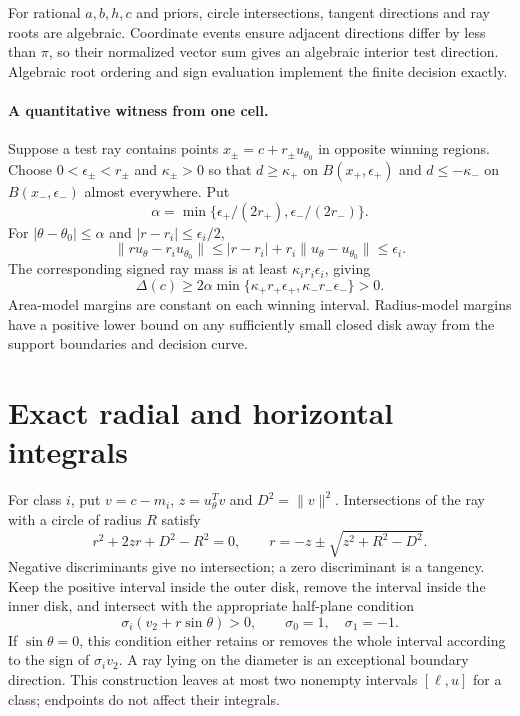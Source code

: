 For rational $a,b,h,c$ and priors, circle intersections, tangent directions and ray roots are algebraic. Coordinate events ensure adjacent directions differ by less than $\pi$, so their normalized vector sum gives an algebraic interior test direction. Algebraic root ordering and sign evaluation implement the finite decision exactly.

\paragraph{A quantitative witness from one cell.}
Suppose a test ray contains points $x_\pm=c+r_\pm u_{\theta_0}$ in opposite winning regions. Choose $0<\epsilon_\pm<r_\pm$ and $\kappa_\pm>0$ so that $d\geq\kappa_+$ on $B(x_+,\epsilon_+)$ and $d\leq-\kappa_-$ on $B(x_-,\epsilon_-)$ almost everywhere. Put
\[
 \alpha=\min\{\epsilon_+/(2r_+),\epsilon_-/(2r_-)\}.
\]
For $|\theta-\theta_0|\leq\alpha$ and $|r-r_i|\leq\epsilon_i/2$,
\[
 \|ru_\theta-r_i u_{\theta_0}\|
 \leq|r-r_i|+r_i\|u_\theta-u_{\theta_0}\|\leq\epsilon_i.
\]
The corresponding signed ray mass is at least $\kappa_i r_i\epsilon_i$, giving
\begin{equation}
 \Delta(c)\geq2\alpha\min\{\kappa_+r_+\epsilon_+,
                              \kappa_-r_-\epsilon_-\}>0.
 \label{supp:eq:witness}
\end{equation}
Area-model margins are constant on each winning interval. Radius-model margins have a positive lower bound on any sufficiently small closed disk away from the support boundaries and decision curve.

\section{Exact radial and horizontal integrals}
\label{supp:radial}

For class $i$, put $v=c-m_i$, $z=u_\theta^Tv$ and $D^2=\|v\|^2$. Intersections of the ray with a circle of radius $R$ satisfy
\[
 r^2+2zr+D^2-R^2=0,
 \qquad r=-z\pm\sqrt{z^2+R^2-D^2}.
\]
Negative discriminants give no intersection; a zero discriminant is a tangency. Keep the positive interval inside the outer disk, remove the interval inside the inner disk, and intersect with the appropriate half-plane condition
\[
 \sigma_i(v_2+r\sin\theta)>0,
 \qquad\sigma_0=1,\quad\sigma_1=-1.
\]
If $\sin\theta=0$, this condition either retains or removes the whole interval according to the sign of $\sigma_i v_2$. A ray lying on the diameter is an exceptional boundary direction. This construction leaves at most two nonempty intervals $[\ell,u]$ for a class; endpoints do not affect their integrals.

